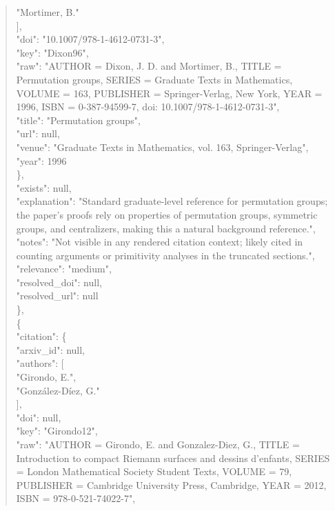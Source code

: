 \documentclass[11pt]{article}
\begin{document}
\begin{quote}
          "Mortimer, B."\\
        ],\\
        "doi": "10.1007/978-1-4612-0731-3",\\
        "key": "Dixon96",\\
        "raw": "AUTHOR = Dixon, J. D. and Mortimer, B., TITLE = Permutation groups, SERIES = Graduate Texts in Mathematics, VOLUME = 163, PUBLISHER = Springer-Verlag, New York, YEAR = 1996, ISBN = 0-387-94599-7, doi: 10.1007/978-1-4612-0731-3",\\
        "title": "Permutation groups",\\
        "url": null,\\
        "venue": "Graduate Texts in Mathematics, vol. 163, Springer-Verlag",\\
        "year": 1996\\
      \},\\
      "exists": null,\\
      "explanation": "Standard graduate-level reference for permutation groups; the paper's proofs rely on properties of permutation groups, symmetric groups, and centralizers, making this a natural background reference.",\\
      "notes": "Not visible in any rendered citation context; likely cited in counting arguments or primitivity analyses in the truncated sections.",\\
      "relevance": "medium",\\
      "resolved\_doi": null,\\
      "resolved\_url": null\\
    \},\\
    \{\\
      "citation": \{\\
        "arxiv\_id": null,\\
        "authors": [\\
          "Girondo, E.",\\
          "González-Díez, G."\\
        ],\\
        "doi": null,\\
        "key": "Girondo12",\\
        "raw": "AUTHOR = Girondo, E. and Gonzalez-Diez, G., TITLE = Introduction to compact Riemann surfaces and dessins d'enfants, SERIES = London Mathematical Society Student Texts, VOLUME = 79, PUBLISHER = Cambridge University Press, Cambridge, YEAR = 2012, ISBN = 978-0-521-74022-7",\\

\end{quote}
\end{document}
